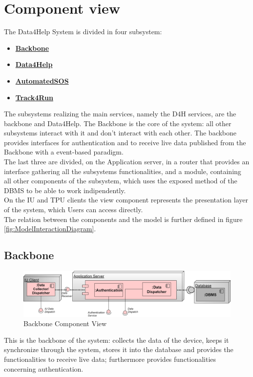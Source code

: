 \section{Component view}
\label{sect:ComponetView}
The Data4Help System is divided in four subsystem:
\begin{itemize}
\item \textbf{\hyperref[subsect:backboneComponentView]{Backbone}}
\item \textbf{\hyperref[subsect:D4HComponentView]{Data4Help}}
\item \textbf{\hyperref[subsect:ASOSComponentView]{AutomatedSOS}}
\item \textbf{\hyperref[subsect:T4RComponentView]{Track4Run}}
\end{itemize}
The subsystems realizing the main services, namely the D4H services, are the backbone and Data4Help.
The Backbone is the core of the system: all other subsystems interact with it and don't interact with each other. The backbone provides interfaces for authentication and to receive live data published from the Backbone with a event-based paradigm.\\
The last three are divided, on the Application server, in a router that provides an interface gathering all the subsystems functionalities, and a module, containing all other components of the subsystem, which uses the exposed method of the DBMS to be able to work indipendently. \\
On the IU and TPU clients the view component represents the presentation layer of the system, which Users can access directly.\\
The relation between the components and the model is further defined in figure \ref{fig:ModelInteractionDiagram}.
\subsection{Backbone}
\label{subsect:backboneComponentView}
\begin{figure}[H]
\caption{Backbone Component View}
\includegraphics[width = \textwidth]{sections/architecturalDesign/BackboneDiagram.png}
\end{figure}
This is the backbone of the system: collects the data of the device, keeps it synchronize through the system, stores it into the database and provides the functionalities to receive live data; furthermore provides functionalities concerning authentication.

